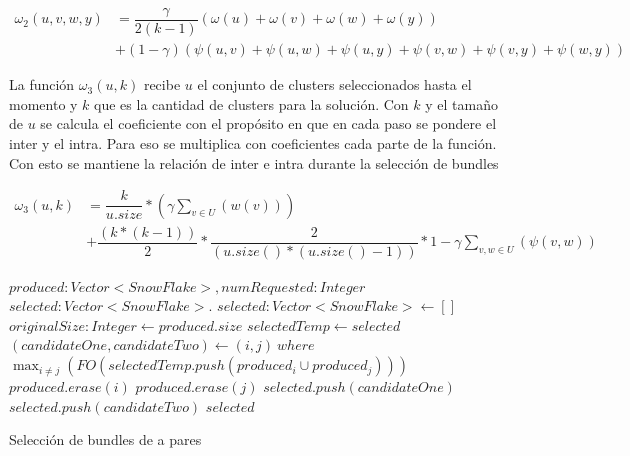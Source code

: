 \begin{equation}
\begin{split}
\omega_{2}(u,v,w,y) &= \dfrac{\gamma}{2( k - 1)} (\omega(u) + \omega(v) + \omega(w) + \omega(y)) \\
&+ (1 - \gamma)(\psi(u,v) + \psi(u,w) + \psi(u,y)  + \psi(v,w) + \psi(v,y) + \psi(w,y))
\end{split}
\end{equation}

La función $\omega_{3}(u, k)$ recibe $u$ el conjunto de clusters seleccionados hasta el momento 
y $k$ que es la cantidad de clusters para la solución. Con $k$ y el tamaño de $u$ se calcula el 
coeficiente con el propósito en que en cada paso se pondere el inter y el intra. Para eso se multiplica
con coeficientes cada parte de la función. Con esto se mantiene la relación de inter e intra durante la selección de bundles

\begin{equation}
\begin{split}
\omega_{3}(u,k) &= \dfrac{k}{u.size} * (\gamma \sum_{v \in U}(w(v))) \\
&+ \dfrac{(k * (k-1))}{2} * \dfrac{2}{(u.size() * (u.size() - 1))} * 1 - \gamma \sum_{v,w \in U}(\psi(v,w))
\end{split}
\end{equation}

\begin{algorithm}[H]
\begin{algorithmic}[1]
\REQUIRE $produced:Vector<SnowFlake>, numRequested:Integer$
\ENSURE $selected:Vector<SnowFlake>$.
\STATE $selected:Vector<SnowFlake> \leftarrow []$
\STATE $originalSize:Integer \leftarrow produced.size$
\STATE $selectedTemp \leftarrow selected$
\STATE $(candidateOne, candidateTwo) \leftarrow (i, j)\ where$ \\ 
$\displaystyle\max_{i \neq j} (FO(selectedTemp.push(produced_{i} \cup produced_{j})))$
\STATE $produced.erase(i)$
\STATE $produced.erase(j)$
\STATE $selected.push(candidateOne)$
\STATE $selected.push(candidateTwo)$
\ENDWHILE
\RETURN $selected$
\end{algorithmic}
\caption{Selección de bundles de a pares}\label{alg:algSelTuple}
\end{algorithm}
